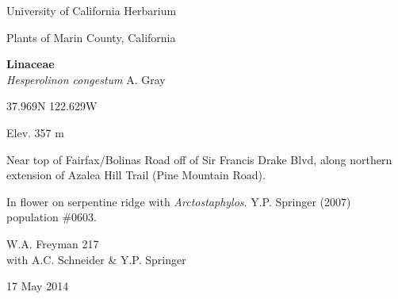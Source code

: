 \documentclass[letterpaper,10pt]{article}
\begin{document}
\begin{minipage}[t]{0.40\textwidth}

\begin{center}
University of California Herbarium \\
\begin{large}
Plants of Marin County, California \\
\end{large}
\vspace{\baselineskip}
\textbf{Linaceae} \\
\textit{Hesperolinon congestum} A. Gray\\
\end{center}

\begin{footnotesize}

\begin{multicols}{2}
37.969\textdegree N 122.629\textdegree W
\columnbreak
\begin{flushright}
Elev. 357 m
\end{flushright}
\end{multicols}

Near top of Fairfax/Bolinas Road off of Sir Francis Drake Blvd, along northern extension of Azalea Hill Trail (Pine Mountain Road).
\vspace{\baselineskip}

In flower on serpentine ridge with \textit{Arctostaphylos}. Y.P. Springer (2007) population \#0603.

\begin{multicols}{2}
W.A. Freyman 217 \\
with A.C. Schneider \& Y.P. Springer
\columnbreak
\begin{flushright}
17 May 2014
\end{flushright}
\end{multicols}

\end{footnotesize}

\end{minipage}

\vspace{2cm}
%
%

%
%
\end{document}
